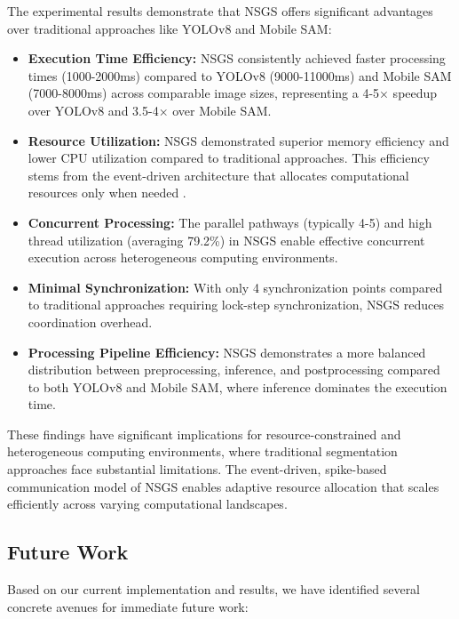 \documentclass[conference]{IEEEtran}
\begin{document}
The experimental results demonstrate that NSGS offers significant advantages over traditional approaches like YOLOv8 and Mobile SAM:

\begin{itemize}
    \item \textbf{Execution Time Efficiency:} NSGS consistently achieved faster processing times (1000-2000ms) compared to YOLOv8 (9000-11000ms) and Mobile SAM (7000-8000ms) across comparable image sizes, representing a 4-5× speedup over YOLOv8 and 3.5-4× over Mobile SAM.
    
    \item \textbf{Resource Utilization:} NSGS demonstrated superior memory efficiency and lower CPU utilization compared to traditional approaches. This efficiency stems from the event-driven architecture that allocates computational resources only when needed \cite{Merolla2014}.
    
    \item \textbf{Concurrent Processing:} The parallel pathways (typically 4-5) and high thread utilization (averaging 79.2\%) in NSGS enable effective concurrent execution across heterogeneous computing environments.
    
    \item \textbf{Minimal Synchronization:} With only 4 synchronization points compared to traditional approaches requiring lock-step synchronization, NSGS reduces coordination overhead.
    
    \item \textbf{Processing Pipeline Efficiency:} NSGS demonstrates a more balanced distribution between preprocessing, inference, and postprocessing compared to both YOLOv8 and Mobile SAM, where inference dominates the execution time.
\end{itemize}

These findings have significant implications for resource-constrained and heterogeneous computing environments, where traditional segmentation approaches face substantial limitations. The event-driven, spike-based communication model of NSGS enables adaptive resource allocation that scales efficiently across varying computational landscapes.

\subsection{Future Work}
Based on our current implementation and results, we have identified several concrete avenues for immediate future work:
\end{document}
